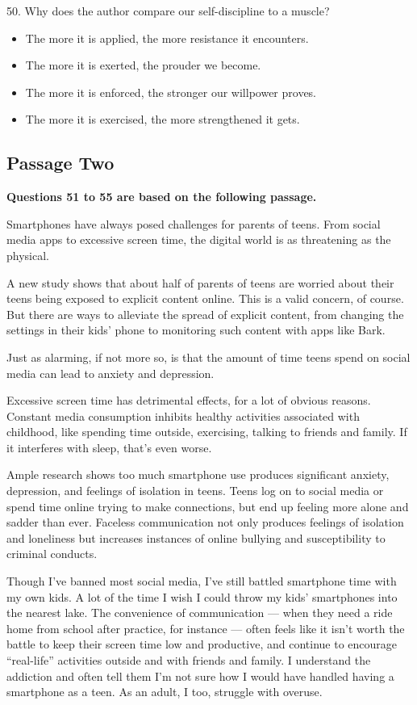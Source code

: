 \documentclass[UTF8,11pt]{ctexart}
\begin{document}
50. Why does the author compare our self-discipline to a muscle?


\begin{itemize}[leftmargin=2em,itemsep=.2em,topsep=.4em]\item[A.] The more it is applied, the more resistance it encounters.
\item[B.] The more it is exerted, the prouder we become.
\item[C.] The more it is enforced, the stronger our willpower proves.
\item[D.] The more it is exercised, the more strengthened it gets.
\end{itemize}

\subsection*{\textbf{Passage Two}}


\textbf{Questions 51 to 55 are based on the following passage.}


Smartphones have always posed challenges for parents of teens. From social media apps to excessive screen time, the digital world is as threatening as the physical.


A new study shows that about half of parents of teens are worried about their teens being exposed to explicit content online. This is a valid concern, of course. But there are ways to alleviate the spread of explicit content, from changing the settings in their kids’ phone to monitoring such content with apps like Bark.


Just as alarming, if not more so, is that the amount of time teens spend on social media can lead to anxiety and depression.


Excessive screen time has detrimental effects, for a lot of obvious reasons. Constant media consumption inhibits healthy activities associated with childhood, like spending time outside, exercising, talking to friends and family. If it interferes with sleep, that’s even worse.


Ample research shows too much smartphone use produces significant anxiety, depression, and feelings of isolation in teens. Teens log on to social media or spend time online trying to make connections, but end up feeling more alone and sadder than ever. Faceless communication not only produces feelings of isolation and loneliness but increases instances of online bullying and susceptibility to criminal conducts.


Though I’ve banned most social media, I’ve still battled smartphone time with my own kids. A lot of the time I wish I could throw my kids’ smartphones into the nearest lake. The convenience of communication — when they need a ride home from school after practice, for instance — often feels like it isn’t worth the battle to keep their screen time low and productive, and continue to encourage “real-life” activities outside and with friends and family. I understand the addiction and often tell them I’m not sure how I would have handled having a smartphone as a teen. As an adult, I too, struggle with overuse.
\end{document}
